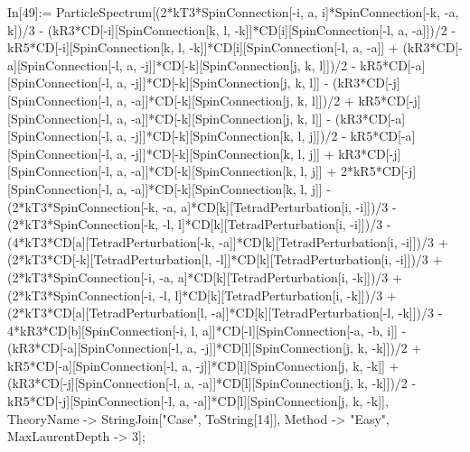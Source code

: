 In[49]:= ParticleSpectrum[(2*kT3*SpinConnection[-i, a, i]*SpinConnection[-k, -a, k])/3 - (kR3*CD[-i][SpinConnection[k, l, -k]]*CD[i][SpinConnection[-l, a, -a]])/2 - kR5*CD[-i][SpinConnection[k, l, -k]]*CD[i][SpinConnection[-l, a, -a]] + (kR3*CD[-a][SpinConnection[-l, a, -j]]*CD[-k][SpinConnection[j, k, l]])/2 - kR5*CD[-a][SpinConnection[-l, a, -j]]*CD[-k][SpinConnection[j, k, l]] - (kR3*CD[-j][SpinConnection[-l, a, -a]]*CD[-k][SpinConnection[j, k, l]])/2 + kR5*CD[-j][SpinConnection[-l, a, -a]]*CD[-k][SpinConnection[j, k, l]] - (kR3*CD[-a][SpinConnection[-l, a, -j]]*CD[-k][SpinConnection[k, l, j]])/2 - kR5*CD[-a][SpinConnection[-l, a, -j]]*CD[-k][SpinConnection[k, l, j]] + kR3*CD[-j][SpinConnection[-l, a, -a]]*CD[-k][SpinConnection[k, l, j]] + 2*kR5*CD[-j][SpinConnection[-l, a, -a]]*CD[-k][SpinConnection[k, l, j]] - (2*kT3*SpinConnection[-k, -a, a]*CD[k][TetradPerturbation[i, -i]])/3 - (2*kT3*SpinConnection[-k, -l, l]*CD[k][TetradPerturbation[i, -i]])/3 - (4*kT3*CD[a][TetradPerturbation[-k, -a]]*CD[k][TetradPerturbation[i, -i]])/3 + (2*kT3*CD[-k][TetradPerturbation[l, -l]]*CD[k][TetradPerturbation[i, -i]])/3 + (2*kT3*SpinConnection[-i, -a, a]*CD[k][TetradPerturbation[i, -k]])/3 + (2*kT3*SpinConnection[-i, -l, l]*CD[k][TetradPerturbation[i, -k]])/3 + (2*kT3*CD[a][TetradPerturbation[l, -a]]*CD[k][TetradPerturbation[-l, -k]])/3 - 4*kR3*CD[b][SpinConnection[-i, l, a]]*CD[-l][SpinConnection[-a, -b, i]] - (kR3*CD[-a][SpinConnection[-l, a, -j]]*CD[l][SpinConnection[j, k, -k]])/2 + kR5*CD[-a][SpinConnection[-l, a, -j]]*CD[l][SpinConnection[j, k, -k]] + (kR3*CD[-j][SpinConnection[-l, a, -a]]*CD[l][SpinConnection[j, k, -k]])/2 - kR5*CD[-j][SpinConnection[-l, a, -a]]*CD[l][SpinConnection[j, k, -k]], TheoryName -> StringJoin["Case", ToString[14]], Method -> "Easy", MaxLaurentDepth -> 3]; 